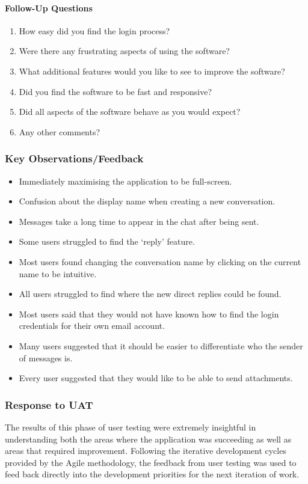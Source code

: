 \paragraph{Follow-Up Questions}
\begin{enumerate}
  \item How easy did you find the login process?
  \item Were there any frustrating aspects of using the software?
  \item What additional features would you like to see to improve the software?
  \item Did you find the software to be fast and responsive?
  \item Did all aspects of the software behave as you would expect?
  \item Any other comments?
\end{enumerate}

\subsubsection{Key Observations/Feedback}
\begin{itemize}
  \item Immediately maximising the application to be full-screen.
  \item Confusion about the display name when creating a new conversation.
  \item Messages take a long time to appear in the chat after being sent.
  \item Some users struggled to find the `reply' feature.
  \item Most users found changing the conversation name by clicking on the current name to be intuitive.
  \item All users struggled to find where the new direct replies could be found.
  \item Most users said that they would not have known how to find the login credentials for their own email account.
  \item Many users suggested that it should be easier to differentiate who the sender of messages is.
  \item Every user suggested that they would like to be able to send attachments.
\end{itemize}

\subsubsection{Response to UAT}
The results of this phase of user testing were extremely insightful in understanding both the areas where the application was succeeding as well as areas that required improvement. Following the iterative development cycles provided by the Agile methodology, the feedback from user testing was used to feed back directly into the development priorities for the next iteration of work.

